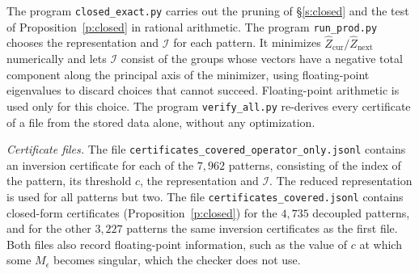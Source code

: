 The program \texttt{closed\_exact.py} carries out the pruning of \S\ref{s:closed} and the test of Proposition~\ref{p:closed} in rational arithmetic. The program \texttt{run\_prod.py} chooses the representation and $\mathcal I$ for each pattern. It minimizes $\hat Z_{\mathrm{cur}} / \hat Z_{\mathrm{next}}$ numerically and lets $\mathcal I$ consist of the groups whose vectors have a negative total component along the principal axis of the minimizer, using floating-point eigenvalues to discard choices that cannot succeed. Floating-point arithmetic is used only for this choice. The program \texttt{verify\_all.py} re-derives every certificate of a file from the stored data alone, without any optimization.

\emph{Certificate files.} The file \texttt{certificates\_\allowbreak covered\_\allowbreak operator\_\allowbreak only.jsonl} contains an inversion certificate for each of the $7{,}962$ patterns, consisting of the index of the pattern, its threshold $c$, the representation and $\mathcal I$. The reduced representation is used for all patterns but two. The file \texttt{certificates\_\allowbreak covered.jsonl} contains closed-form certificates (Proposition~\ref{p:closed}) for the $4{,}735$ decoupled patterns, and for the other $3{,}227$ patterns the same inversion certificates as the first file. Both files also record floating-point information, such as the value of $c$ at which some $M_\epsilon$ becomes singular, which the checker does not use.


